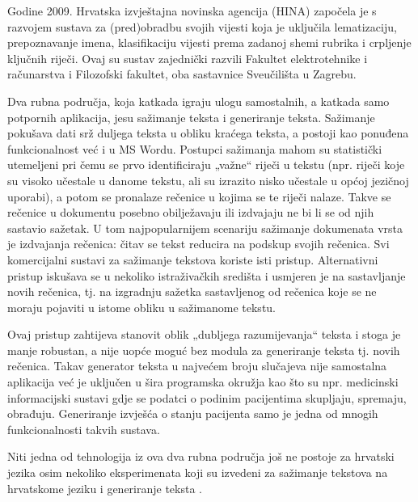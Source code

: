 \begin{multicols}{2}

Godine 2009. Hrvatska izvještajna novinska agencija (HINA) \cite{str25} započela je s razvojem sustava za (pred)obradbu svojih vijesti koja je uključila lematizaciju, prepoznavanje imena, klasifikaciju vijesti prema zadanoj shemi rubrika i crpljenje ključnih riječi. Ovaj su sustav zajednički razvili Fakultet elektrotehnike i računarstva \cite{str26} i Filozofski fakultet, oba sastavnice Sveučilišta u Zagrebu.

Dva rubna područja, koja katkada igraju ulogu samostalnih, a katkada samo potpornih aplikacija, jesu sažimanje teksta i generiranje teksta. Sažimanje pokušava dati srž duljega teksta u obliku kraćega teksta, a postoji kao ponuđena funkcionalnost već i u MS Wordu. Postupci sažimanja mahom su statistički utemeljeni pri čemu se prvo identificiraju „važne“ riječi u tekstu (npr. riječi koje su visoko učestale u danome tekstu, ali su izrazito nisko učestale u općoj jezičnoj uporabi), a potom se pronalaze rečenice u kojima se te riječi nalaze. Takve se rečenice u dokumentu posebno obilježavaju ili izdvajaju ne bi li se od njih sastavio sažetak. U tom najpopularnijem scenariju sažimanje dokumenata vrsta je izdvajanja rečenica: čitav se tekst reducira na podskup svojih rečenica. Svi komercijalni sustavi za sažimanje tekstova koriste isti pristup. Alternativni pristup iskušava se u nekoliko istraživačkih središta i usmjeren je na sastavljanje novih rečenica, tj. na izgradnju sažetka sastavljenog od rečenica koje se ne moraju pojaviti u istome obliku u sažimanome tekstu.


Ovaj pristup zahtijeva stanovit oblik „dubljega razumijevanja“ teksta i stoga je manje robustan, a nije uopće moguć bez modula za generiranje teksta tj. novih rečenica. Takav generator teksta u najvećem broju slučajeva nije samostalna aplikacija već je uključen u šira programska okružja kao što su npr. medicinski informacijski sustavi gdje se podatci o podinim pacijentima skupljaju, spremaju, obrađuju. Generiranje izvješća o stanju pacijenta samo je jedna od mnogih funkcionalnosti takvih sustava.

Niti jedna od tehnologija iz ova dva rubna područja još ne postoje za hrvatski jezika osim nekoliko eksperimenata koji su izvedeni za sažimanje tekstova na hrvatskome jeziku \cite{art5} i generiranje teksta \cite{art6}. 


\end{multicols}
